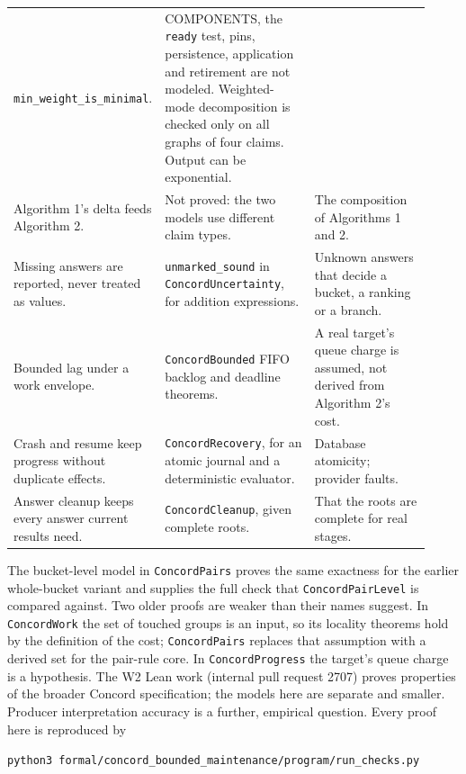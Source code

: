 \documentclass[11pt]{article}
\newcommand{\code}[1]{\texttt{#1}}
\begin{document}
{\begin{longtable}{@{}>{\raggedright}p{0.25\linewidth}>{\raggedright}p{0.37\linewidth}>{\raggedright\arraybackslash}p{0.30\linewidth}@{}}
\code{min\_weight\_is\_minimal}. &
COMPONENTS, the \code{ready} test, pins, persistence, application and
retirement are not modeled. Weighted-mode decomposition is checked only on all
graphs of four claims. Output can be exponential.\\[3pt]
Algorithm 1's delta feeds Algorithm 2. &
Not proved: the two models use different claim types. &
The composition of Algorithms 1 and 2.\\[3pt]
Missing answers are reported, never treated as values. &
\code{unmarked\_sound} in \code{ConcordUncertainty}, for addition expressions. &
Unknown answers that decide a bucket, a ranking or a branch.\\[3pt]
Bounded lag under a work envelope. &
\code{ConcordBounded} FIFO backlog and deadline theorems. &
A real target's queue charge is assumed, not derived from Algorithm 2's
cost.\\[3pt]
Crash and resume keep progress without duplicate effects. &
\code{ConcordRecovery}, for an atomic journal and a deterministic evaluator. &
Database atomicity; provider faults.\\[3pt]
Answer cleanup keeps every answer current results need. &
\code{ConcordCleanup}, given complete roots. &
That the roots are complete for real stages.\\
\end{longtable}}

\medskip
The bucket-level model in \code{ConcordPairs} proves the same exactness for
the earlier whole-bucket variant and supplies the full check that
\code{ConcordPairLevel} is compared against. Two older proofs are weaker than
their names suggest. In \code{ConcordWork}
the set of touched groups is an input, so its locality theorems hold by the
definition of the cost; \code{ConcordPairs} replaces that assumption with a
derived set for the pair-rule core. In \code{ConcordProgress} the target's
queue charge is a hypothesis. The
W2 Lean work (internal pull request 2707) proves properties
of the broader Concord specification; the models here are separate and
smaller. Producer interpretation accuracy is a further, empirical question.
Every proof here is reproduced by
\begin{center}{\small\code{python3 formal/concord\_bounded\_maintenance/program/run\_checks.py}}\end{center}
\end{document}
